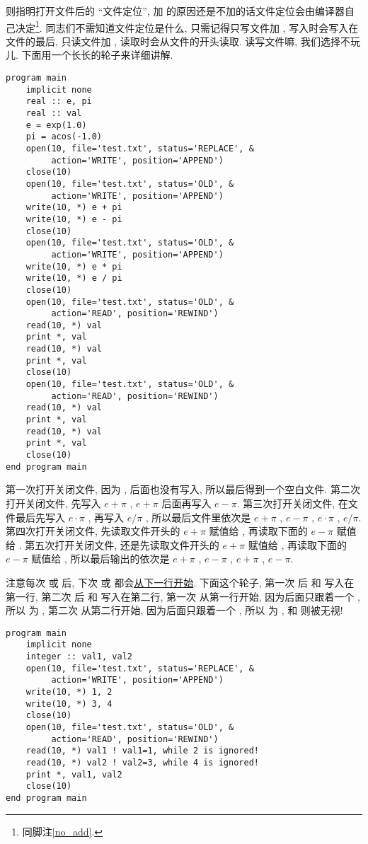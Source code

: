  则指明打开文件后的 ``文件定位'', 加  的原因还是不加的话文件定位会由编译器自己决定\footnote{同脚注\ref{no_add}.}. 同志们不需知道文件定位是什么, 只需记得只写文件加 , 写入时会写入在文件的最后, 只读文件加 , 读取时会从文件的开头读取. 读写文件嘛, 我们选择不玩儿. 下面用一个长长的轮子来详细讲解. 
\begin{lstlisting}
program main
    implicit none
    real :: e, pi
    real :: val
    e = exp(1.0)
    pi = acos(-1.0)
    open(10, file='test.txt', status='REPLACE', &
         action='WRITE', position='APPEND')
    close(10)
    open(10, file='test.txt', status='OLD', &
         action='WRITE', position='APPEND')
    write(10, *) e + pi
    write(10, *) e - pi
    close(10)
    open(10, file='test.txt', status='OLD', &
         action='WRITE', position='APPEND')
    write(10, *) e * pi
    write(10, *) e / pi
    close(10)
    open(10, file='test.txt', status='OLD', &
         action='READ', position='REWIND')
    read(10, *) val
    print *, val
    read(10, *) val
    print *, val
    close(10)
    open(10, file='test.txt', status='OLD', &
         action='READ', position='REWIND')
    read(10, *) val
    print *, val
    read(10, *) val
    print *, val
    close(10)
end program main
\end{lstlisting}
第一次打开关闭文件, 因为 , 后面也没有写入, 所以最后得到一个空白文件. 第二次打开关闭文件, 先写入 $ e+\pi $ , $ e+\pi $ 后面再写入 $ e-\pi $. 第三次打开关闭文件, 在文件最后先写入 $ e\cdot\pi $ , 再写入 $ e/\pi $ , 所以最后文件里依次是 $ e+\pi $ , $ e-\pi $ , $ e\cdot\pi $ , $ e/\pi $. 第四次打开关闭文件, 先读取文件开头的 $ e+\pi $ 赋值给 , 再读取下面的 $ e-\pi $ 赋值给 . 第五次打开关闭文件, 还是先读取文件开头的 $ e+\pi $ 赋值给 , 再读取下面的 $ e-\pi $ 赋值给 , 所以最后输出的依次是 $ e+\pi $ , $ e-\pi $ , $ e+\pi $ , $ e-\pi $. 

注意每次  或  后, 下次  或  都会\uline{从下一行开始}. 下面这个轮子, 第一次  后  和  写入在第一行, 第二次  后  和  写入在第二行, 第一次  从第一行开始, 因为后面只跟着一个 , 所以  为 , 第二次  从第二行开始, 因为后面只跟着一个 , 所以  为 ,  和  则被无视!
\begin{lstlisting}
program main
    implicit none
    integer :: val1, val2
    open(10, file='test.txt', status='REPLACE', &
         action='WRITE', position='APPEND')
    write(10, *) 1, 2
    write(10, *) 3, 4
    close(10)
    open(10, file='test.txt', status='OLD', &
         action='READ', position='REWIND')
    read(10, *) val1 ! val1=1, while 2 is ignored!
    read(10, *) val2 ! val2=3, while 4 is ignored!
    print *, val1, val2
    close(10)
end program main
\end{lstlisting}


